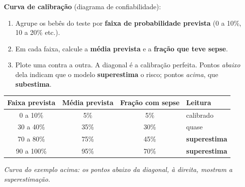 \documentclass[11pt,a4paper]{article}
\begin{document}
\textbf{Curva de calibração} (diagrama de confiabilidade):
\begin{enumerate}
  \item Agrupe os bebês do teste por \textbf{faixa de probabilidade prevista} (0 a 10\%, 10 a 20\% etc.).
  \item Em cada faixa, calcule a \textbf{média prevista} e a \textbf{fração que teve sepse}.
  \item Plote uma contra a outra. A diagonal é a calibração perfeita. Pontos \emph{abaixo} dela indicam que o modelo \textbf{superestima} o risco; pontos \emph{acima}, que \textbf{subestima}.
\end{enumerate}

\begin{exemplo}
\begin{center}
\small
\begin{tabular}{@{}cccl@{}}
\toprule
\textbf{Faixa prevista} & \textbf{Média prevista} & \textbf{Fração com sepse} & \textbf{Leitura} \\
\midrule
0 a 10\% & 5\% & 5\% & calibrado \\
30 a 40\% & 35\% & 30\% & quase \\
70 a 80\% & 75\% & 45\% & \textbf{superestima} \\
90 a 100\% & 95\% & 70\% & \textbf{superestima} \\
\bottomrule
\end{tabular}
\end{center}
\end{exemplo}

\begin{center}

{\small\emph{Curva do exemplo acima: os pontos abaixo da diagonal, à direita, mostram a superestimação.}}
\end{center}
\end{document}
